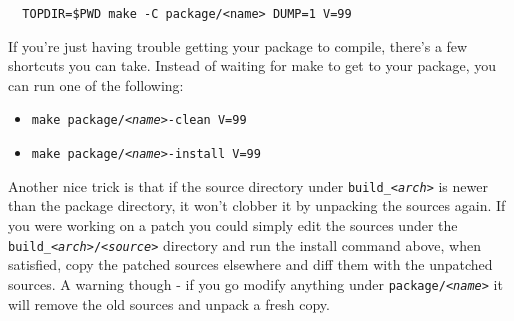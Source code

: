 \begin{Verbatim}
  TOPDIR=$PWD make -C package/<name> DUMP=1 V=99
\end{Verbatim}

If you're just having trouble getting your package to compile, there's a few
shortcuts you can take. Instead of waiting for make to get to your package, you can
run one of the following:

\begin{itemize}
    \item \texttt{make package/\textit{<name>}-clean V=99}
    \item \texttt{make package/\textit{<name>}-install V=99}
\end{itemize}

Another nice trick is that if the source directory under \texttt{build\_\textit{<arch>}}
is newer than the package directory, it won't clobber it by unpacking the sources again.
If you were working on a patch you could simply edit the sources under the
\texttt{build\_\textit{<arch>}/\textit{<source>}} directory and run the install command above,
when satisfied, copy the patched sources elsewhere and diff them with the unpatched
sources. A warning though - if you go modify anything under \texttt{package/\textit{<name>}}
it will remove the old sources and unpack a fresh copy.

